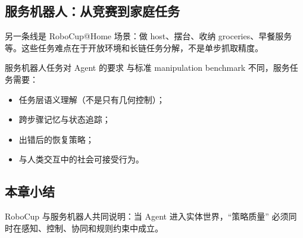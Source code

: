 \subsection{服务机器人：从竞赛到家庭任务}
另一条线是 RoboCup@Home 场景：做 host、摆台、收纳 groceries、早餐服务等。这些任务难点在于开放环境和长链任务分解，不是单步抓取精度。

\begin{importantbox}{服务机器人任务对 Agent 的要求}
与标准 manipulation benchmark 不同，服务任务需要：
\begin{itemize}
    \item 任务层语义理解（不是只有几何控制）；
    \item 跨步骤记忆与状态追踪；
    \item 出错后的恢复策略；
    \item 与人类交互中的社会可接受行为。
\end{itemize}
\end{importantbox}

\subsection{本章小结}
RoboCup 与服务机器人共同说明：当 Agent 进入实体世界，``策略质量'' 必须同时在感知、控制、协同和规则约束中成立。

